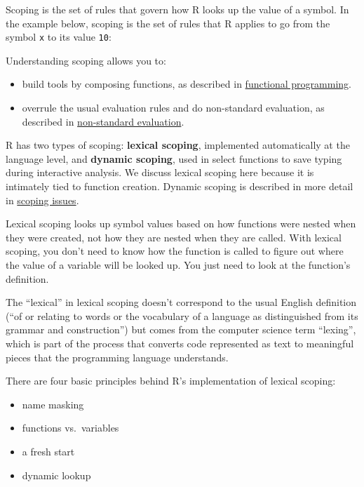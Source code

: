 Scoping is the set of rules that govern how R looks up the value of a
symbol. In the example below, scoping is the set of rules that R applies
to go from the symbol \texttt{x} to its value \texttt{10}:
 

\begin{Shaded}
\begin{Highlighting}[]
\StringTok{ }
\end{Highlighting}
\end{Shaded}

Understanding scoping allows you to:

\begin{itemize}
\item
  build tools by composing functions, as described in
  \hyperref[functional-programming]{functional programming}.
\item
  overrule the usual evaluation rules and do non-standard evaluation, as
  described in \hyperref[nse]{non-standard evaluation}.
\end{itemize}

R has two types of scoping: \textbf{lexical scoping}, implemented
automatically at the language level, and \textbf{dynamic scoping}, used
in select functions to save typing during interactive analysis. We
discuss lexical scoping here because it is intimately tied to function
creation. Dynamic scoping is described in more detail in
\hyperref[scoping-issues]{scoping issues}.

Lexical scoping looks up symbol values based on how functions were
nested when they were created, not how they are nested when they are
called. With lexical scoping, you don't need to know how the function is
called to figure out where the value of a variable will be looked up.
You just need to look at the function's definition.

The ``lexical'' in lexical scoping doesn't correspond to the usual
English definition (``of or relating to words or the vocabulary of a
language as distinguished from its grammar and construction'') but comes
from the computer science term ``lexing'', which is part of the process
that converts code represented as text to meaningful pieces that the
programming language understands.

There are four basic principles behind R's implementation of lexical
scoping:

\begin{itemize}
\itemsep1pt\parskip0pt
\item
  name masking
\item
  functions vs.~variables
\item
  a fresh start
\item
  dynamic lookup
\end{itemize}

